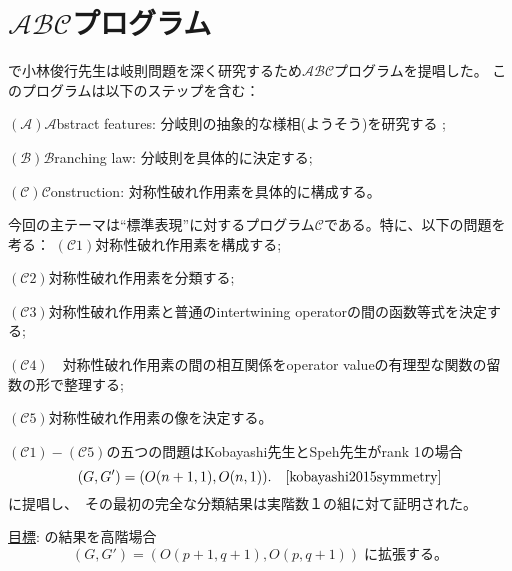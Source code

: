 \documentclass[notheorems]{beamer}
\theoremstyle{definition}
\theoremstyle{example}
\theoremstyle{remark}
\theoremstyle{mystyle}
\begin{document}
\section{$\mathcal{A}\mathcal{B}\mathcal{C}$プログラム}

\begin{frame}{}
	\quad \cite{kobayashi2015program}で小林俊行先生は岐則問題を深く研究するため$\mathcal{ABC}$プログラムを提唱した。
	このプログラムは以下のステップを含む：{
		
}\qquad$(\mathcal{A})$\quad$\mathcal{A}$bstract features: 分岐則の抽象的な様相(ようそう)を研究する
;{

}\qquad$(\mathcal{B})$\quad$\mathcal{B}$ranching law: 分岐則を具体的に決定する; {

}\qquad$(\mathcal{C})$\quad$\mathcal{C}${onstruction}: 対称性破れ作用素を具体的に構成する。
\end{frame}
\begin{frame}{}
	今回の主テーマは``標準表現''に対するプログラム$\mathcal{C}$である。特に、以下の問題を考る：
\vspace{-1em}{

}\qquad$(\mathcal{C}1)$\quad 対称性破れ作用素を構成する;{

	\vspace{-0.4em}
}\qquad$(\mathcal{C}2)$\quad 対称性破れ作用素を分類する;{

	\vspace{-0.4em}
}\qquad$(\mathcal{C}3)$\quad 対称性破れ作用素と普通のintertwining operatorの間の函数等式を決定する;{

	\vspace{-0.6em}
}\qquad$(\mathcal{C}4) \quad$対称性破れ作用素の間の相互関係をoperator valueの有理型な関数の留数の形で整理する;{

	\vspace{-0.6em}
}\qquad$(\mathcal{C}5)$\quad 対称性破れ作用素の像を決定する。{

}\vspace{-1em}\quad $(\mathcal{C}1) - (\mathcal{C}5)$の五つの問題はKobayashi先生とSpeh先生がrank 1の場合
\vspace{-0.6em}
\begin{equation*}
	(G, G') = (O (n + 1, 1), O (n, 1)). \quad\mbox{\cite{kobayashi2015symmetry}}
\vspace{-0.2em}
\end{equation*}
\mbox{に提唱し、\kern-0.1cm その最初の完全な分類結果は実階数１の組に対て証明された。}
\begin{block}{\underline{目標}:}
	\cite{kobayashi2015symmetry}の結果を高階場合
\vspace{-1em}
	\begin{equation*}
		(G, G') = (O (p + 1, q + 1), O (p, q + 1))\;\mbox{に拡張する。}
	\end{equation*}
\end{block}
\end{frame}
\end{document}
